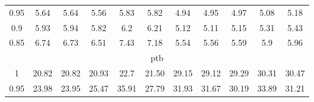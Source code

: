 \begin{table}[tb]
{\begin{tabular}{@{}ccccccccccc@{}}
\multicolumn{1}{c|}{0.95}        & 5.64  & 5.64                                                 & 5.56                                                 & 5.83   & \multicolumn{1}{c|}{5.82}                                                 & 4.94  & 4.95                                                 & 4.97                                                 & 5.08  & 5.18                                                 \\
\multicolumn{1}{c|}{0.9}         & 5.93  & 5.94                                                 & 5.82                                                 & 6.2    & \multicolumn{1}{c|}{6.21}                                                 & 5.12  & 5.11                                                 & 5.15                                                 & 5.31  & 5.43                                                 \\
\multicolumn{1}{c|}{0.85}        & 6.74  & 6.73                                                 & 6.51                                                 & 7.43   & \multicolumn{1}{c|}{7.18}                                                 & 5.54  & 5.56                                                 & 5.59                                                 & 5.9   & 5.96                                                 \\ \midrule
\multicolumn{11}{c}{ptb}                                                                                                                                                                                                                                                                                                                                                                                                         \\ \midrule
\multicolumn{1}{c|}{1}           & 20.82 & 20.82                                                & 20.93                                                & 22.7   & \multicolumn{1}{c|}{21.50}                                                & 29.15 & 29.12                                                & 29.29                                                & 30.31 & 30.47                                                \\
\multicolumn{1}{c|}{0.95}        & 23.98 & 23.95                                                & 25.47                                                & 35.91  & \multicolumn{1}{c|}{27.79}                                                & 31.93 & 31.67                                                & 30.19                                                & 33.89 & 31.21                                                \\

\end{tabular}}
\end{table}
